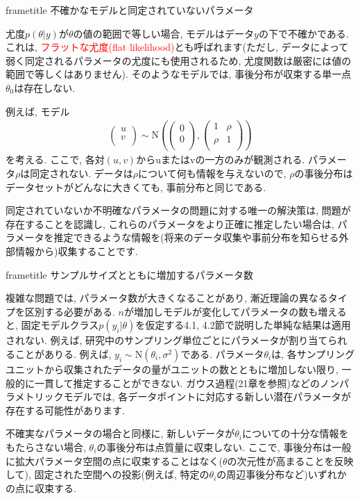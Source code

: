 \documentclass[10pt,dvipdfmx,a4]{beamer}
\newcommand{\eqn}[1]{\begin{align*}#1\end{align*}}
\newcommand{\dbox}[1]{\begin{beamercolorbox}[wd=122mm, sep=0pt, shadow=false, rounded=false]{frametitle} { #1}\end{beamercolorbox}}
\newcommand{\tcr}[1]{\textcolor{red}{#1}}
\begin{document}
\begin{frame}
\dbox{不確かなモデルと同定されていないパラメータ}
尤度$p(\theta|y)$が$\theta$の値の範囲で等しい場合, モデルはデータ$y$の下で不確かである.
これは, \tcr{フラットな尤度(flat likelihood)}とも呼ばれます(ただし, データによって弱く同定されるパラメータの尤度にも使用されるため, 尤度関数は厳密には値の範囲で等しくはありません).
そのようなモデルでは, 事後分布が収束する単一点$\theta_0$は存在しない.

例えば, モデル
\eqn{\begin{pmatrix}u\\v\\\end{pmatrix}\sim\text{N}\left(\begin{pmatrix}0\\0\\\end{pmatrix}, \begin{pmatrix}1&\rho \\ \rho&1\\\end{pmatrix}\right)}
を考える.
ここで, 各対$(u, v)$からuまたはvの一方のみが観測される.
パラメータ$\rho$は同定されない.
データは$\rho$について何も情報を与えないので, $\rho$の事後分布はデータセットがどんなに大きくても, 事前分布と同じである.

同定されていないか不明確なパラメータの問題に対する唯一の解決策は, 問題が存在することを認識し, これらのパラメータをより正確に推定したい場合は, パラメータを推定できるような情報を(将来のデータ収集や事前分布を知らせる外部情報から)収集することです.
\end{frame}


\begin{frame}
\dbox{サンプルサイズとともに増加するパラメータ数}
複雑な問題では, パラメータ数が大きくなることがあり, 漸近理論の異なるタイプを区別する必要がある.
$n$が増加しモデルが変化してパラメータの数も増えると, 固定モデルクラス$p(y_i|\theta)$を仮定する4.1, 4.2節で説明した単純な結果は適用されない.
例えば, 研究中のサンプリング単位ごとにパラメータが割り当てられることがありる.
例えば, $y_i\sim \text{N}(\theta_i, \sigma^2)$である.
パラメータ$\theta_i$は, 各サンプリングユニットから収集されたデータの量がユニットの数とともに増加しない限り, 一般的に一貫して推定することができない.
ガウス過程(21章を参照)などのノンパラメトリックモデルでは, 各データポイントに対応する新しい潜在パラメータが存在する可能性があります.

不確実なパラメータの場合と同様に, 新しいデータが$\theta_i$についての十分な情報をもたらさない場合, $\theta_i$の事後分布は点質量に収束しない.
ここで, 事後分布は一般に拡大パラメータ空間の点に収束することはなく($\theta$の次元性が高まることを反映して), 固定された空間への投影(例えば, 特定の$\theta_i$の周辺事後分布など)いずれかの点に収束する.
\end{frame}
\end{document}
